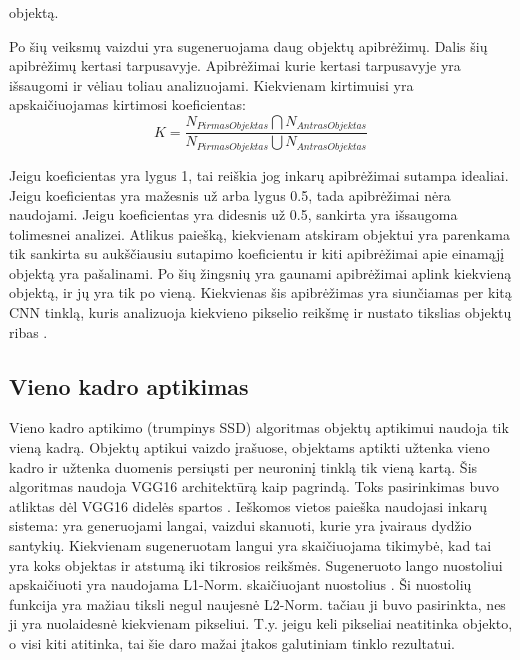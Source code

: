 \documentclass{VUMIFInfKursinis}
\begin{document}
objektą. \cite{salt15}
\par
Po šių veiksmų vaizdui yra sugeneruojama daug objektų apibrėžimų. Dalis šių apibrėžimų
kertasi tarpusavyje. Apibrėžimai kurie kertasi tarpusavyje yra išsaugomi ir vėliau
toliau analizuojami. \cite{salt15} Kiekvienam kirtimuisi yra apskaičiuojamas kirtimosi koeficientas:
\[
  K = \frac{N_{PirmasObjektas} \bigcap N_{AntrasObjektas}}{N_{PirmasObjektas} \bigcup N_{AntrasObjektas}}
\]
\par
Jeigu koeficientas yra lygus 1, tai reiškia jog inkarų apibrėžimai sutampa idealiai.
Jeigu koeficientas yra mažesnis už arba lygus 0.5, tada apibrėžimai nėra naudojami.
Jeigu koeficientas yra didesnis už 0.5, sankirta yra išsaugoma tolimesnei analizei.
Atlikus paiešką, kiekvienam atskiram objektui yra parenkama tik sankirta su aukščiausiu
sutapimo koeficientu ir kiti apibrėžimai apie einamąjį objektą yra pašalinami.
Po šių žingsnių yra gaunami apibrėžimai aplink kiekvieną objektą, ir jų yra tik po
vieną. Kiekvienas šis apibrėžimas yra siunčiamas per kitą CNN tinklą, kuris analizuoja
kiekvieno pikselio reikšmę ir nustato tikslias objektų ribas \cite{salt15}.












\subsection{Vieno kadro aptikimas}
\par
Vieno kadro aptikimo (trumpinys SSD) algoritmas objektų aptikimui naudoja tik vieną kadrą.
Objektų aptikui vaizdo įrašuose, objektams aptikti užtenka vieno kadro ir užtenka
duomenis persiųsti per neuroninį tinklą tik vieną kartą. Šis algoritmas
naudoja VGG16 architektūrą kaip pagrindą. Toks pasirinkimas buvo atliktas dėl VGG16
didelės spartos \cite{salt20}. Ieškomos vietos paieška naudojasi inkarų sistema:
yra generuojami langai, vaizdui skanuoti, kurie yra įvairaus dydžio santykių.
Kiekvienam sugeneruotam langui yra skaičiuojama tikimybė, kad tai yra koks objektas
ir atstumą iki tikrosios reikšmės. Sugeneruoto lango nuostoliui apskaičiuoti
yra naudojama L1-Norm. skaičiuojant nuostolius \cite{salt20}. Ši nuostolių funkcija
yra mažiau tiksli negul naujesnė L2-Norm. tačiau ji buvo pasirinkta, nes ji yra nuolaidesnė
kiekvienam pikseliui. T.y. jeigu keli pikseliai neatitinka objekto, o visi kiti atitinka,
tai šie daro mažai įtakos galutiniam tinklo rezultatui.
\end{document}
